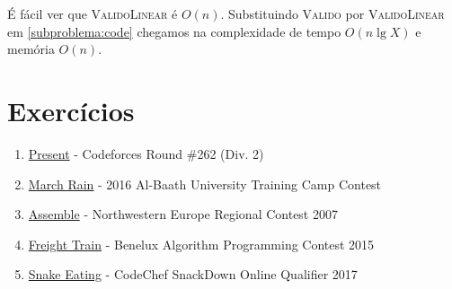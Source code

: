 
É fácil ver que \textsc{ValidoLinear} é $O(n)$. Substituindo \textsc{Valido} por \textsc{ValidoLinear} em \ref{subproblema:code} chegamos na complexidade de tempo $O(n \lg X)$ e memória $O(n)$.

\section{Exercícios}

\begin{enumerate}
  \item \href{https://codeforces.com/problemset/problem/460/C}{Present} - Codeforces Round \#262 (Div. 2)
  \item \href{https://codeforces.com/problemset/gymProblem/101028/I}{March Rain} - 2016 Al-Baath University Training Camp Contest
  \item \href{https://icpcarchive.ecs.baylor.edu/index.php?option=com_onlinejudge&Itemid=8&page=show_problem&problem=1972}{Assemble} - Northwestern Europe Regional Contest 2007
  \item \href{https://open.kattis.com/problems/freighttrain}{Freight Train} - Benelux Algorithm Programming Contest 2015
  \item \href{https://www.codechef.com/problems/SNAKEEAT}{Snake Eating} - CodeChef SnackDown Online Qualifier 2017
\end{enumerate}
